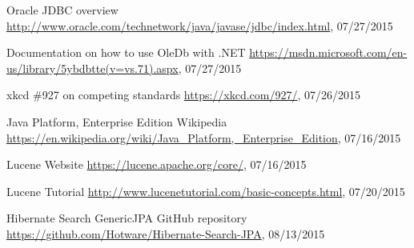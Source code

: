 \begin{thebibliography}{99}
	Oracle JDBC overview
	\url{http://www.oracle.com/technetwork/java/javase/jdbc/index.html}, 07/27/2015
	
	Documentation on how to use OleDb with .NET
	\url{https://msdn.microsoft.com/en-us/library/5ybdbtte(v=vs.71).aspx}, 07/27/2015
	
	xkcd \#927 on competing standards
	\url{https://xkcd.com/927/}, 07/26/2015
	
	Java Platform, Enterprise Edition
	Wikipedia
	\url{https://en.wikipedia.org/wiki/Java_Platform,_Enterprise_Edition}, 07/16/2015
	
	Lucene Website
	\url{https://lucene.apache.org/core/}, 07/16/2015
	
	Lucene Tutorial
	\url{http://www.lucenetutorial.com/basic-concepts.html}, 07/20/2015
	
	Hibernate Search GenericJPA GitHub repository
	\url{https://github.com/Hotware/Hibernate-Search-JPA}, 08/13/2015
	
	
\end{thebibliography}